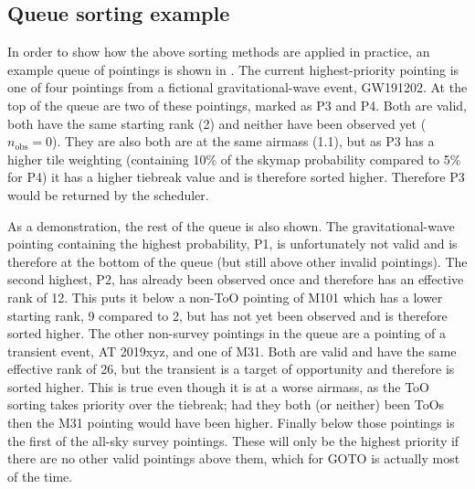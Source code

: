 \begin{colsection}
\subsection{Queue sorting example}
\label{sec:sorting_example}
\begin{colsection}

In order to show how the above sorting methods are applied in practice, an example queue of pointings is shown in . The current highest-priority pointing is one of four pointings from a fictional gravitational-wave event, GW191202. At the top of the queue are two of these pointings, marked as P3 and P4. Both are valid, both have the same starting rank (2) and neither have been observed yet ($n_\text{obs}=0$). They are also both are at the same airmass (1.1), but as P3 has a higher tile weighting (containing 10\% of the skymap probability compared to 5\% for P4) it has a higher tiebreak value and is therefore sorted higher. Therefore P3 would be returned by the scheduler.

As a demonstration, the rest of the queue is also shown. The gravitational-wave pointing containing the highest probability, P1, is unfortunately not valid and is therefore at the bottom of the queue (but still above other invalid pointings). The second highest, P2, has already been observed once and therefore has an effective rank of 12. This puts it below a non-ToO pointing of M101 which has a lower starting rank, 9 compared to 2, but has not yet been observed and is therefore sorted higher. The other non-survey pointings in the queue are a pointing of a transient event, AT 2019xyz, and one of M31. Both are valid and have the same effective rank of 26, but the transient is a target of opportunity and therefore is sorted higher. This is true even though it is at a worse airmass, as the ToO sorting takes priority over the tiebreak; had they both (or neither) been ToOs then the M31 pointing would have been higher. Finally below those pointings is the first of the all-sky survey pointings. These will only be the highest priority if there are no other valid pointings above them, which for GOTO is actually most of the time.


\end{colsection}
\end{colsection}
